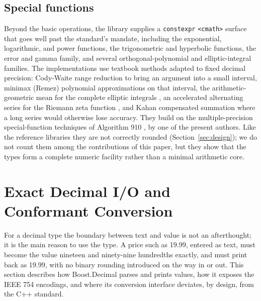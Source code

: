 \documentclass[acmsmall]{acmart}
\begin{document}
\subsection{Special functions}
\label{sec:special}
Beyond the basic operations, the library supplies a \texttt{constexpr} \texttt{<cmath>}
surface that goes well past the standard's mandate, including the exponential, logarithmic,
and power functions, the trigonometric and hyperbolic functions, the error and gamma
family, and several orthogonal-polynomial and elliptic-integral families. The
implementations use textbook methods adapted to fixed decimal precision: Cody-Waite range
reduction \cite{cody_waite1980} to bring an argument into a small interval, minimax (Remez)
polynomial approximations \cite{muller2016} on that interval, the arithmetic-geometric mean
for the complete elliptic integrals \cite{dlmf, algorithm910}, an accelerated alternating
series for the Riemann zeta function \cite{borwein1995}, and Kahan compensated summation
\cite{kahan1965} where a long series would otherwise lose accuracy. They build on the
multiple-precision special-function techniques of Algorithm 910 \cite{algorithm910}, by one
of the present authors. Like the reference libraries they are not correctly rounded
(Section~\ref{sec:design}); we do not count them among the contributions of this paper, but
they show that the types form a complete numeric facility rather than a minimal arithmetic
core.

\section{Exact Decimal I/O and Conformant Conversion}
\label{sec:io}

For a decimal type the boundary between text and value is not an afterthought; it is the
main reason to use the type. A price such as 19.99, entered as text, must become the
value nineteen and ninety-nine hundredths exactly, and must print back as 19.99, with no
binary rounding introduced on the way in or out. This section describes how
Boost.Decimal parses and prints values, how it exposes the IEEE 754 encodings, and where
its conversion interface deviates, by design, from the C++ standard.
\end{document}
